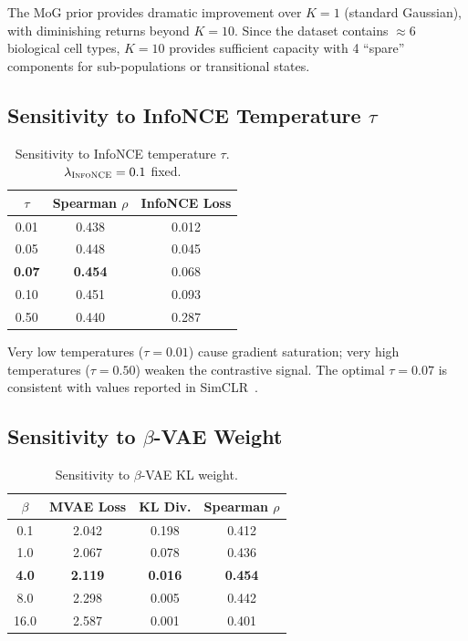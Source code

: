 \documentclass[11pt,a4paper]{article}
\newcommand{\nce}{\textsc{InfoNCE}}
\begin{document}
The MoG prior provides dramatic improvement over $K=1$ (standard Gaussian), with diminishing returns beyond $K=10$.
Since the dataset contains $\approx$6 biological cell types, $K=10$ provides sufficient capacity with 4 ``spare'' components for sub-populations or transitional states.

\subsection{Sensitivity to InfoNCE Temperature $\tau$}

\begin{table}[!ht]
\centering
\caption{Sensitivity to InfoNCE temperature $\tau$. $\lambda_\nce=0.1$ fixed.}
\label{tab:tau_sens}
\scriptsize
\begin{tabular}{c c c}
\toprule
$\tau$ & Spearman $\rho$ & InfoNCE Loss \\
\midrule
0.01 & 0.438 & 0.012 \\
0.05 & 0.448 & 0.045 \\
\textbf{0.07} & \textbf{0.454} & 0.068 \\
0.10 & 0.451 & 0.093 \\
0.50 & 0.440 & 0.287 \\
\bottomrule
\end{tabular}
\end{table}

Very low temperatures ($\tau=0.01$) cause gradient saturation; very high temperatures ($\tau=0.50$) weaken the contrastive signal.
The optimal $\tau=0.07$ is consistent with values reported in SimCLR~\citep{chen2020}.

\subsection{Sensitivity to $\beta$-VAE Weight}

\begin{table}[!ht]
\centering
\caption{Sensitivity to $\beta$-VAE KL weight.}
\label{tab:beta_sens}
\scriptsize
\begin{tabular}{c c c c}
\toprule
$\beta$ & MVAE Loss & KL Div. & Spearman $\rho$ \\
\midrule
0.1 & 2.042 & 0.198 & 0.412 \\
1.0 & 2.067 & 0.078 & 0.436 \\
\textbf{4.0} & \textbf{2.119} & \textbf{0.016} & \textbf{0.454} \\
8.0 & 2.298 & 0.005 & 0.442 \\
16.0 & 2.587 & 0.001 & 0.401 \\
\bottomrule
\end{tabular}
\end{table}
\end{document}
